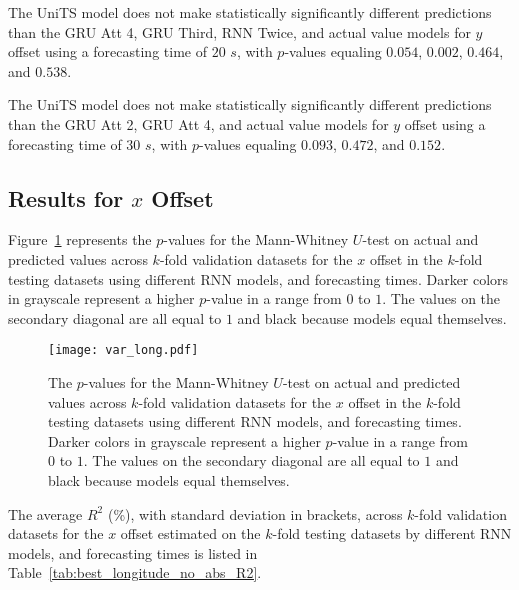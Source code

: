 The UniTS model does not make statistically significantly different predictions than the GRU Att 4, GRU Third, RNN Twice, and actual value models for $y$ offset using a forecasting time of $20$ $s$, with $p$-values equaling $0.054$, $0.002$, $0.464$, and $0.538$.

The UniTS model does not make statistically significantly different predictions than the GRU Att 2, GRU Att 4, and actual value models for $y$ offset using a forecasting time of $30$ $s$, with $p$-values equaling $0.093$, $0.472$, and $0.152$.

\subsection{Results for $x$ Offset}

Figure~\ref{fig:var_long} represents the $p$-values for the Mann-Whitney $U$-test on actual and predicted values across $k$-fold validation datasets for the $x$ offset in the $k$-fold testing datasets using different RNN models, and forecasting times. Darker colors in grayscale represent a higher $p$-value in a range from $0$ to $1$. The values on the secondary diagonal are all equal to $1$ and black because models equal themselves.

\begin{figure}[!ht]
	\centering
	\texttt{[image: var\_long.pdf]}
	\caption{The $p$-values for the Mann-Whitney $U$-test on actual and predicted values across $k$-fold validation datasets for the $x$ offset in the $k$-fold testing datasets using different RNN models, and forecasting times. Darker colors in grayscale represent a higher $p$-value in a range from $0$ to $1$. The values on the secondary diagonal are all equal to $1$ and black because models equal themselves.}
	\label{fig:var_long}
\end{figure}

The average $R^{2}$ (\%), with standard deviation in brackets, across $k$-fold validation datasets for the $x$ offset estimated on the $k$-fold testing datasets by different RNN models, and forecasting times is listed in Table~\ref{tab:best_longitude_no_abs_R2}.

